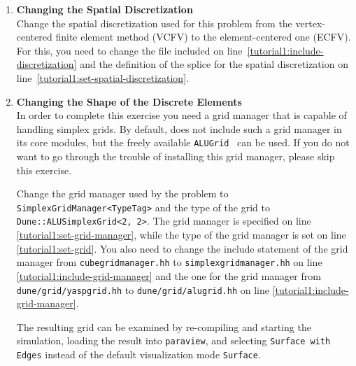 \begin{enumerate}
\item \textbf{Changing the Spatial Discretization} \\
  Change the spatial discretization used for this problem from the
  vertex-centered finite element method (VCFV) to the element-centered
  one (ECFV). For this, you need to change the file included on
  line~\ref{tutorial1:include-discretization} and the definition of
  the splice for the spatial discretization on
  line~\ref{tutorial1:set-spatial-discretization}.

\item \textbf{Changing the Shape of the Discrete Elements} \\
  In order to complete this exercise you need a \Dune grid manager
  that is capable of handling simplex grids. By default, \Dune does
  not include such a grid manager in its core modules, but the freely
  available \texttt{ALUGrid}~\cite{ALUGRID-HP} can be used. If you do
  not want to go through the trouble of installing this grid manager,
  please skip this exercise.

  Change the grid manager used by the problem to
  \texttt{SimplexGridManager<TypeTag>} and the type of the grid to
  \texttt{Dune::ALUSimplexGrid<2, 2>}. The grid manager is specified
  on line \ref{tutorial1:set-grid-manager}, while the type of the
  \Dune grid manager is set on line
  \ref{tutorial1:set-grid}. You also need to change the include
  statement of the grid manager from \texttt{cubegridmanager.hh} to
  \texttt{simplexgridmanager.hh} on line
  \ref{tutorial1:include-grid-manager} and the one for the grid
  manager from \texttt{dune/grid/yaspgrid.hh} to
  \texttt{dune/grid/alugrid.hh} on line \ref{tutorial1:include-grid-manager}.

  The resulting grid can be examined by re-compiling and starting the
  simulation, loading the result into \texttt{paraview}, and selecting
  \texttt{Surface with Edges} instead of the default visualization
  mode \texttt{Surface}.


\end{enumerate}
